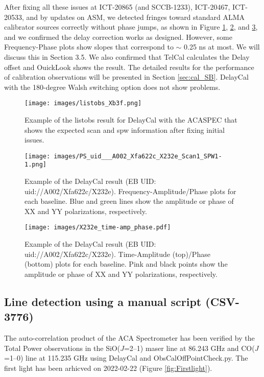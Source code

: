 After fixing all these issues at ICT-20865 (and SCCB-1233), ICT-20467, ICT-20533, and by updates on ASM, we detected fringes toward standard ALMA calibrator sources correctly without phase jumps, as shown in Figure \ref{fig:DelayCal_listobs}, \ref{fig:DelayCal_freq}, and \ref{fig:DelayCal_time}, and we confirmed the delay correction works as designed. However, some Frequency-Phase plots show slopes that correspond to $\sim$ 0.25 ns at most. We will discuss this in Section 3.5. We also confirmed that TelCal calculates the Delay offset and OuickLook shows the result. The detailed results for the performance of calibration observations will be presented in Section \ref{sec:cal_SB}. DelayCal with the 180-degree Walsh switching option does not show problems. 

\begin{figure}[htbp]
     \centering
    \texttt{[image: images/listobs\_Xb3f.png]}
     \caption{Example of the listobs result for DelayCal with the ACASPEC that shows the expected scan and spw information after fixing initial issues.}
     \label{fig:DelayCal_listobs}
\end{figure}

\begin{figure}[htbp]
     \centering
    \texttt{[image: images/PS\_uid\_\_\_A002\_Xfa622c\_X232e\_Scan1\_SPW1-1.png]}
     \caption{Example of the DelayCal result (EB UID: uid://A002/Xfa622c/X232e). Frequency-Amplitude/Phase plots for each baseline. Blue and green lines show the amplitude or phase of XX and YY polarizations, respectively.}
     \label{fig:DelayCal_freq}
\end{figure}

\begin{figure}[htbp]
     \centering
    \texttt{[image: images/X232e\_time-amp\_phase.pdf]}
     \caption{Example of the DelayCal result (EB UID: uid://A002/Xfa622c/X232e). Time-Amplitude (top)/Phase (bottom) plots for each baseline. Pink and black points show the amplitude or phase of XX and YY polarizations, respectively.}
     \label{fig:DelayCal_time}
\end{figure}

\newpage

\subsection{Line detection using a manual script  (CSV-3776)}
The auto-correlation product of the ACA Spectrometer has been verified by the Total Power observations in the SiO($J$=2--1) maser line at 86.243 GHz and CO($J$=1--0) line at 115.235 GHz using DelayCal and ObsCalOffPointCheck.py. The first light has been arhicved on 2022-02-22 (Figure \ref{fig:Firstlight}). 

